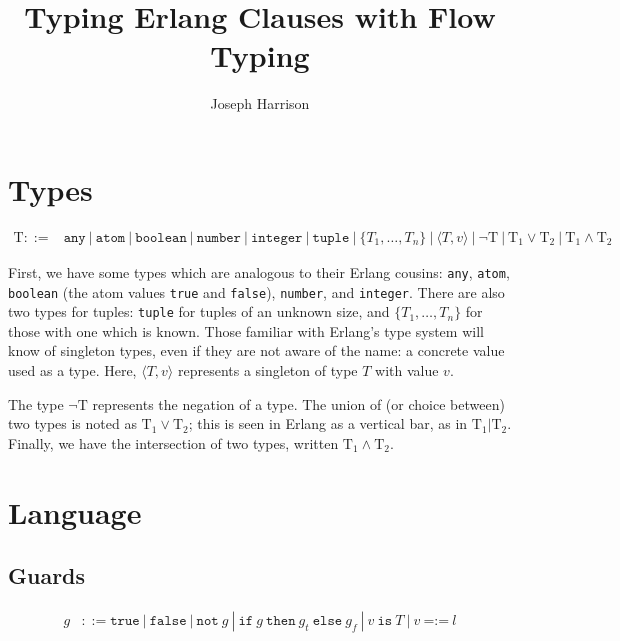 \documentclass[nonacm,timestamp,manuscript]{acmart}
\title{Typing Erlang Clauses with Flow Typing}
\author{Joseph Harrison}
\affiliation{%
  \department{School of Computing}
  \institution{University of Kent}
  \city{Canterbury}
  \country{United Kingdom}}
\newcommand{\alt}{\ |\ }
\newcommand{\atom}[1]{\texttt{#1}}
\newcommand{\tuple}{\{ T_1, \ldots, T_n \}}
\newcommand{\singleton}[2]{\langle #1, #2 \rangle} %
\newcommand{\singletonex}{\singleton{T}{v}}
\newcommand{\type}{\text{T}}
\newcommand{\res}[1]{\texttt{#1}}
\begin{document}
\maketitle

\tableofcontents

\section{Types}

\begin{align*}
  \type ::={}&
               \atom{any} \alt
               \atom{atom} \alt \atom{boolean} \alt
               \atom{number} \alt \atom{integer} \alt
               \atom{tuple} \alt \tuple \alt
               \singletonex \alt
               \neg \type \alt
               {\type}_1 \lor {\type}_2 \alt {\type}_1 \land {\type}_2
\end{align*}

First, we have some types which are analogous to their Erlang cousins:
\atom{any}, \atom{atom}, \atom{boolean} (the atom values \texttt{true} and
\texttt{false}), \atom{number}, and \atom{integer}. There are also two types for
tuples: \atom{tuple} for tuples of an unknown size, and $\tuple$ for those with
one which is known. Those familiar with Erlang's type system will know of
singleton types, even if they are not aware of the name: a concrete value used
as a type. Here, $\singletonex$ represents a singleton of type $T$ with value
$v$.

The type $\neg \type$ represents the negation of a type. The union of (or choice
between) two types is noted as ${\type}_1 \lor {\type}_2$; this is seen in
Erlang as a vertical bar, as in ${\type}_1 | {\type}_2$. Finally, we have the
intersection of two types, written ${\type}_1 \land {\type}_2$.


\section{Language}

\subsection{Guards}

\begin{align*}
  g &{}::= \res{true} \alt \res{false} \alt \res{not}\ g \alt
      \res{if}\ g\ \res{then}\ g_t\ \res{else}\ g_f \alt
      v\ \res{is}\ T \alt v\ \res{=:=}\ l
\end{align*}
\end{document}
